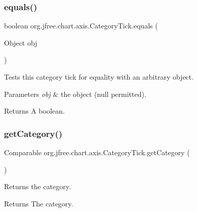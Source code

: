 \subsubsection{\texorpdfstring{equals()}{equals()}}
{\footnotesize\ttfamily boolean org.\+jfree.\+chart.\+axis.\+Category\+Tick.\+equals (\begin{DoxyParamCaption}\item[{Object}]{obj }\end{DoxyParamCaption})}

Tests this category tick for equality with an arbitrary object.


\begin{DoxyParams}{Parameters}
{\em obj} & the object ({\ttfamily null} permitted).\\
\hline
\end{DoxyParams}
\begin{DoxyReturn}{Returns}
A boolean. 
\end{DoxyReturn}
\mbox{\label{classorg_1_1jfree_1_1chart_1_1axis_1_1_category_tick_a9fdb2b94c359cfe7a15d69bf3cbed845}} 
\subsubsection{\texorpdfstring{get\+Category()}{getCategory()}}
{\footnotesize\ttfamily Comparable org.\+jfree.\+chart.\+axis.\+Category\+Tick.\+get\+Category (\begin{DoxyParamCaption}{ }\end{DoxyParamCaption})}

Returns the category.

\begin{DoxyReturn}{Returns}
The category. 
\end{DoxyReturn}
\mbox{\label{classorg_1_1jfree_1_1chart_1_1axis_1_1_category_tick_ac6a2970804e77a025c22784c3c35071d}} 
